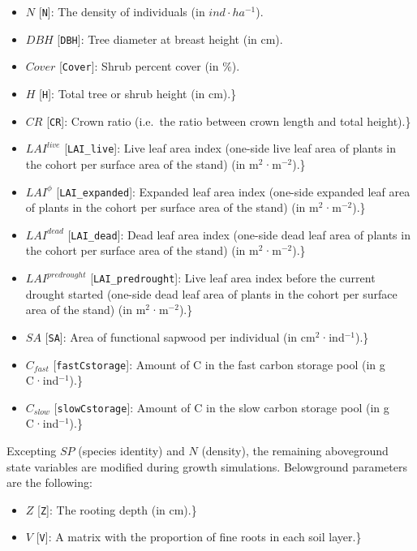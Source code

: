 \documentclass[]{book}
\providecommand{\tightlist}{%
  \setlength{\itemsep}{0pt}\setlength{\parskip}{0pt}}
\begin{document}
\begin{itemize}
\tightlist
\item
  \(N\) {[}\texttt{N}{]}: The density of individuals (in \(ind · ha^{-1}\)).
\item
  \(DBH\) {[}\texttt{DBH}{]}: Tree diameter at breast height (in cm).
\item
  \(Cover\) {[}\texttt{Cover}{]}: Shrub percent cover (in \%).
\item
  \(H\) {[}\texttt{H}{]}: Total tree or shrub height (in cm).\}
\item
  \(CR\) {[}\texttt{CR}{]}: Crown ratio (i.e.~the ratio between crown length and total height).\}
\item
  \(LAI^{live}\) {[}\texttt{LAI\_live}{]}: Live leaf area index (one-side live leaf area of plants in the cohort per surface area of the stand) (in m\(^2\)·m\(^{-2}\)).\}
\item
  \(LAI^{\phi}\) {[}\texttt{LAI\_expanded}{]}: Expanded leaf area index (one-side expanded leaf area of plants in the cohort per surface area of the stand) (in m\(^2\)·m\(^{-2}\)).\}
\item
  \(LAI^{dead}\) {[}\texttt{LAI\_dead}{]}: Dead leaf area index (one-side dead leaf area of plants in the cohort per surface area of the stand) (in m\(^2\)·m\(^{-2}\)).\}
\item
  \(LAI^{predrought}\) {[}\texttt{LAI\_predrought}{]}: Live leaf area index before the current drought started (one-side dead leaf area of plants in the cohort per surface area of the stand) (in m\(^2\)·m\(^{-2}\)).\}
\item
  \(SA\) {[}\texttt{SA}{]}: Area of functional sapwood per individual (in cm\(^2\)·ind\(^{-1}\)).\}
\item
  \(C_{fast}\) {[}\texttt{fastCstorage}{]}: Amount of C in the fast carbon storage pool (in g C·ind\(^{-1}\)).\}
\item
  \(C_{slow}\) {[}\texttt{slowCstorage}{]}: Amount of C in the slow carbon storage pool (in g C·ind\(^{-1}\)).\}
\end{itemize}

Excepting \(SP\) (species identity) and \(N\) (density), the remaining aboveground state variables are modified during growth simulations. Belowground parameters are the following:

\begin{itemize}
\tightlist
\item
  \(Z\) {[}\texttt{Z}{]}: The rooting depth (in cm).\}
\item
  \(V\) {[}\texttt{V}{]}: A matrix with the proportion of fine roots in each soil layer.\}
\end{itemize}
\end{document}
